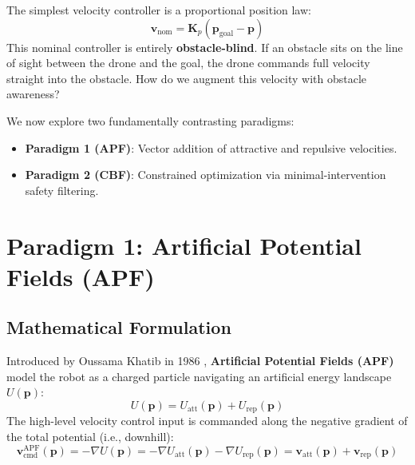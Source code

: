\documentclass[11pt,a4paper]{article}
\begin{document}
\begin{intuitionbox}
The simplest velocity controller is a proportional position law:
\begin{equation}
\mathbf{v}_{\mathrm{nom}} = \mathbf{K}_p (\mathbf{p}_{\mathrm{goal}} - \mathbf{p})
\end{equation}
This nominal controller is entirely \textbf{obstacle-blind}. If an obstacle sits on the line of sight between the drone and the goal, the drone commands full velocity straight into the obstacle. How do we augment this velocity with obstacle awareness?
\end{intuitionbox}

We now explore two fundamentally contrasting paradigms:
\begin{itemize}
    \item \textbf{Paradigm 1 (APF)}: Vector addition of attractive and repulsive velocities.
    \item \textbf{Paradigm 2 (CBF)}: Constrained optimization via minimal-intervention safety filtering.
\end{itemize}

\section{Paradigm 1: Artificial Potential Fields (APF)}

\subsection{Mathematical Formulation}
Introduced by Oussama Khatib in 1986 \cite{khatib1986real}, \textbf{Artificial Potential Fields (APF)} model the robot as a charged particle navigating an artificial energy landscape $U(\mathbf{p})$:
\begin{equation}
U(\mathbf{p}) = U_{\mathrm{att}}(\mathbf{p}) + U_{\mathrm{rep}}(\mathbf{p})
\end{equation}
The high-level velocity control input is commanded along the negative gradient of the total potential (i.e., downhill):
\begin{equation}
\mathbf{v}_{\mathrm{cmd}}^{\mathrm{APF}}(\mathbf{p}) = -\nabla U(\mathbf{p}) = -\nabla U_{\mathrm{att}}(\mathbf{p}) - \nabla U_{\mathrm{rep}}(\mathbf{p}) = \mathbf{v}_{\mathrm{att}}(\mathbf{p}) + \mathbf{v}_{\mathrm{rep}}(\mathbf{p})
\end{equation}
\end{document}
